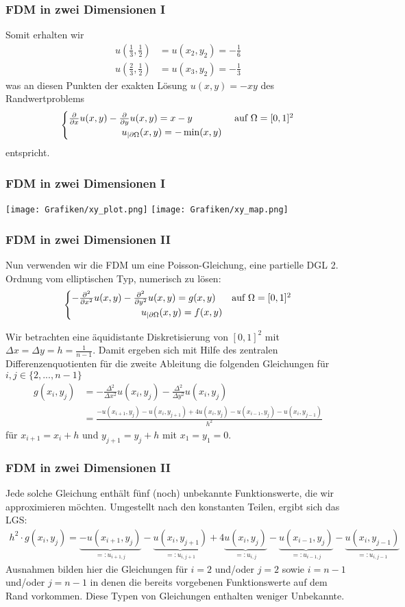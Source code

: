 %
\begin{frame}\frametitle{FDM in zwei Dimensionen I}
Somit erhalten wir
\begin{align*}
u(\frac{1}{3},\frac{1}{2})&=u(x_2,y_2)=- \frac{1}{6}\\
u(\frac{2}{3},\frac{1}{2})&=u(x_3,y_2)=- \frac{1}{3}
\end{align*}
was an diesen Punkten der exakten Lösung $u(x,y)=-xy$ des Randwertproblems
$$
\begin{cases} \frac{\partial}{\partial x} u(x,y)-\frac{\partial}{\partial y}u(x,y)= x-y & \text{ auf } \Omega=[0,1]^2\\ \hspace{19.5mm}u_{|\partial \Omega}(x,y)=-\min(x,y) \end{cases}
$$
entspricht.
\end{frame}
%
\begin{frame}\frametitle{FDM in zwei Dimensionen I}
\texttt{[image: Grafiken/xy\_plot.png]}
\texttt{[image: Grafiken/xy\_map.png]}
\end{frame}
%
\begin{frame}\frametitle{FDM in zwei Dimensionen II}
Nun verwenden wir die FDM um eine Poisson-Gleichung, eine partielle DGL 2. Ordnung vom elliptischen Typ, numerisch zu lösen:
$$
\begin{cases} -\frac{\partial^2}{\partial x^2}u(x,y)-\frac{\partial^2}{\partial y^2}u(x,y)= g(x,y) & \text{auf } \Omega =[0,1]^2\\\hspace{25.5mm}u_{|\partial \Omega}(x,y)=f(x,y)
\end{cases}
$$

Wir betrachten eine äquidistante Diskretisierung von $[0,1]^2$ mit $\Delta x=\Delta y=h=\frac{1}{n-1}$.  Damit ergeben sich mit Hilfe des zentralen Differenzenquotienten für die zweite Ableitung die folgenden Gleichungen für $i,j \in \{2,...,n-1\}$
\small
\begin{align*}
g(x_i,y_j)&=-\frac{\Delta^2}{\Delta x^2}u(x_i,y_j)-\frac{\Delta^2}{\Delta y^2}u(x_i,y_j) \\
&=\frac{-u(x_{i+1},y_j)-u(x_{i},y_{j+1})+4u(x_i,y_j)-u(x_{i-1},y_j)-u(x_{i},y_{j-1})}{h^2}
\end{align*}
\normalsize
für $x_{i+1}=x_i+h$ und $y_{j+1}=y_j+h$ mit $x_1=y_1=0$.
\end{frame}
%
\begin{frame}\frametitle{FDM in zwei Dimensionen II}
Jede solche Gleichung enthält fünf (noch) unbekannte Funktionswerte, die wir approximieren möchten. Umgestellt nach den konstanten Teilen, ergibt sich das LGS:
\small
\begin{align*}
h^2\cdot g(x_i,y_j)=\underbrace{-u(x_{i+1},y_j)}_{=:u_{i+1,j}}-\underbrace{u(x_{i},y_{j+1})}_{=:u_{i,j+1}}+4\underbrace{u(x_i,y_j)}_{=:u_{i,j}}-\underbrace{u(x_{i-1},y_j)}_{=:u_{i-1,j}}-\underbrace{u(x_{i},y_{j-1})}_{=:u_{i,j-1}}
\end{align*}
\normalsize 
Ausnahmen bilden hier die Gleichungen für $i=2$ und/oder $j=2$ sowie $i=n-1$ und/oder $j=n-1$ in denen die bereits vorgebenen Funktionswerte auf dem Rand vorkommen. Diese Typen von Gleichungen enthalten weniger Unbekannte.
\end{frame}
